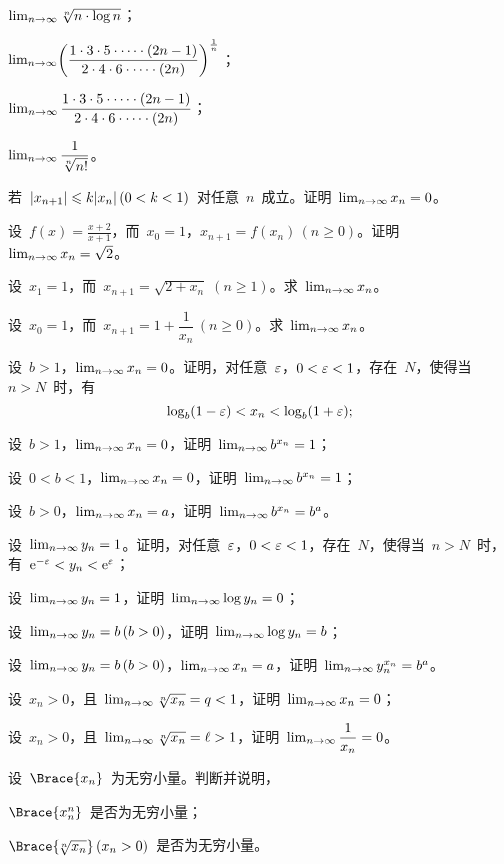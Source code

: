 \begin{exercise}
\begin{exlistcols}
  \item $\lim_\ntoinf\sqrt[n]{n\cdot\ln n}$；
  \item $\lim_\ntoinf\Paren[\bigg]{\dfrac{1\cdot3\cdot5\cdot\dotsm\cdot(2n-1)}{2\cdot4\cdot6\cdot\dotsm\cdot(2n)}}^{\frac1n}$；
  \item $\lim_\ntoinf\dfrac{1\cdot3\cdot5\cdot\dotsm\cdot(2n-1)}{2\cdot4\cdot6\cdot\dotsm\cdot(2n)}$；
  \item $\lim_\ntoinf\dfrac1{\sqrt[n]{n!}}$。
\end{exlistcols}
\item 若~$\abs{x_{n+1}}\leq k\abs{x_n}\,(0<k<1)$~对任意~$n$~成立。证明~$\lim_\ntoinf x_n=0$。
\item 设~$f(x)=\frac{x+2}{x+1}$，而~$x_0=1$，$x_{n+1}=f(x_n)\,(n\geq0)$。证明~$\lim_\ntoinf x_n=\sqrt2$。
\item 设~$x_1=1$，而~$x_{n+1}=\sqrt{2+x_n}\;(n\geq1)$。求~$\lim_\ntoinf x_n$。
\item 设~$x_0=1$，而~$x_{n+1}=1+\dfrac1{x_n}\,(n\geq0)$。求~$\lim_\ntoinf x_n$。
\item\begin{exlist}
  \item 设~$b>1$，$\lim_\ntoinf x_n=0$。证明，对任意~$\e$，$0<\e<1$，存在~$N$，使得当~$n>N$~时，有
  \[
    \log_b(1-\e)<x_n<\log_b(1+\e);
  \]
  \item 设~$b>1$，$\lim_\ntoinf x_n=0$，证明~$\lim_\ntoinf b^{x_n}=1$；
  \item 设~$0<b<1$，$\lim_\ntoinf x_n=0$，证明~$\lim_\ntoinf b^{x_n}=1$；
  \item 设~$b>0$，$\lim_\ntoinf x_n=a$，证明~$\lim_\ntoinf b^{x_n}=b^a$。
\end{exlist}
\item\begin{exlist}
  \item 设~$\lim_\ntoinf y_n=1$。证明，对任意~$\e$，$0<\e<1$，存在~$N$，使得当~$n>N$~时，有~$\me^{-\e}<y_n<\me^\e$；
  \item 设~$\lim_\ntoinf y_n=1$，证明~$\lim_\ntoinf\ln y_n=0$；
  \item 设~$\lim_\ntoinf y_n=b\,(b>0)$，证明~$\lim_\ntoinf\ln y_n=b$；
  \item 设~$\lim_\ntoinf y_n=b\,(b>0)$，$\lim_\ntoinf x_n=a$，证明~$\lim_\ntoinf y_n^{x_n}=b^a$。
\end{exlist}
\item\begin{exlist}
  \item 设~$x_n>0$，且~$\lim_\ntoinf\sqrt[n]{x_n}=q<1$，证明~$\lim_\ntoinf x_n=0$；
  \item 设~$x_n>0$，且~$\lim_\ntoinf\sqrt[n]{x_n}=\ell>1$，证明~$\lim_\ntoinf\dfrac1{x_n}=0$。
\end{exlist}
\item 设~$\Brace{x_n}$~为无穷小量。判断并说明，
\begin{exlistcols}
  \item $\Brace{x_n^n}$~是否为无穷小量；
  \item $\Brace{\!\sqrt[n]{x_n}}\,(x_n>0)$~是否为无穷小量。
\end{exlistcols}
\end{exercise}


